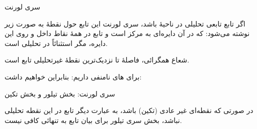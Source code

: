 \EMhold


\begin{EMtheorem}{سری لورنت}

اگر تابع  تابعی تحلیلی در ناحیهٔ  باشد، سری لورنت این تابع حول نقطهٔ  به صورت زیر نوشته می‌شود:
که در آن  دایره‌ای به مرکز  است و تابع در همهٔ نقاط داخل و روی این دایره، مگر استثنائاً در  تحلیلی است.

شعاع همگرائی، فاصلهٔ  تا نزدیک‌ترین نقطهٔ غیرتحلیلی تابع  است.

\end{EMtheorem}

برای  های نامنفی داریم:
بنابراین خواهیم داشت:

\begin{EMimportant}{سری لورنت: بخش تیلور و بخش تکین}


\end{EMimportant}

در صورتی که  نقطه‌ای غیر عادی (تکین) باشد، به عبارت دیگر تابع در این نقطه تحلیلی نباشد، بخش سری تیلور برای بیان تابع به تنهائی کافی نیست.


